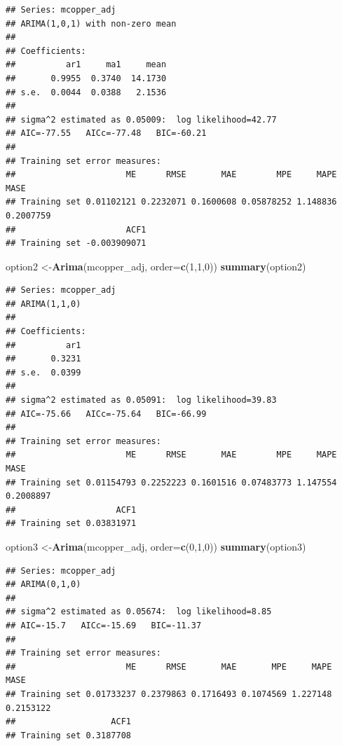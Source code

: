 \documentclass[]{book}
\newenvironment{Shaded}{\begin{snugshade}}{\end{snugshade}}
\newcommand{\DataTypeTok}[1]{\textcolor[rgb]{0.13,0.29,0.53}{#1}}
\newcommand{\DecValTok}[1]{\textcolor[rgb]{0.00,0.00,0.81}{#1}}
\newcommand{\KeywordTok}[1]{\textcolor[rgb]{0.13,0.29,0.53}{\textbf{#1}}}
\newcommand{\NormalTok}[1]{#1}
\begin{document}
\begin{verbatim}
## Series: mcopper_adj 
## ARIMA(1,0,1) with non-zero mean 
## 
## Coefficients:
##          ar1     ma1     mean
##       0.9955  0.3740  14.1730
## s.e.  0.0044  0.0388   2.1536
## 
## sigma^2 estimated as 0.05009:  log likelihood=42.77
## AIC=-77.55   AICc=-77.48   BIC=-60.21
## 
## Training set error measures:
##                      ME      RMSE       MAE        MPE     MAPE      MASE
## Training set 0.01102121 0.2232071 0.1600608 0.05878252 1.148836 0.2007759
##                      ACF1
## Training set -0.003909071
\end{verbatim}

\begin{Shaded}
\begin{Highlighting}[]
\NormalTok{option2 <-}\KeywordTok{Arima}\NormalTok{(mcopper_adj, }\DataTypeTok{order=}\KeywordTok{c}\NormalTok{(}\DecValTok{1}\NormalTok{,}\DecValTok{1}\NormalTok{,}\DecValTok{0}\NormalTok{))}
\KeywordTok{summary}\NormalTok{(option2)}
\end{Highlighting}
\end{Shaded}

\begin{verbatim}
## Series: mcopper_adj 
## ARIMA(1,1,0) 
## 
## Coefficients:
##          ar1
##       0.3231
## s.e.  0.0399
## 
## sigma^2 estimated as 0.05091:  log likelihood=39.83
## AIC=-75.66   AICc=-75.64   BIC=-66.99
## 
## Training set error measures:
##                      ME      RMSE       MAE        MPE     MAPE      MASE
## Training set 0.01154793 0.2252223 0.1601516 0.07483773 1.147554 0.2008897
##                    ACF1
## Training set 0.03831971
\end{verbatim}

\begin{Shaded}
\begin{Highlighting}[]
\NormalTok{option3 <-}\KeywordTok{Arima}\NormalTok{(mcopper_adj, }\DataTypeTok{order=}\KeywordTok{c}\NormalTok{(}\DecValTok{0}\NormalTok{,}\DecValTok{1}\NormalTok{,}\DecValTok{0}\NormalTok{))}
\KeywordTok{summary}\NormalTok{(option3)}
\end{Highlighting}
\end{Shaded}

\begin{verbatim}
## Series: mcopper_adj 
## ARIMA(0,1,0) 
## 
## sigma^2 estimated as 0.05674:  log likelihood=8.85
## AIC=-15.7   AICc=-15.69   BIC=-11.37
## 
## Training set error measures:
##                      ME      RMSE       MAE       MPE     MAPE      MASE
## Training set 0.01733237 0.2379863 0.1716493 0.1074569 1.227148 0.2153122
##                   ACF1
## Training set 0.3187708
\end{verbatim}
\end{document}
